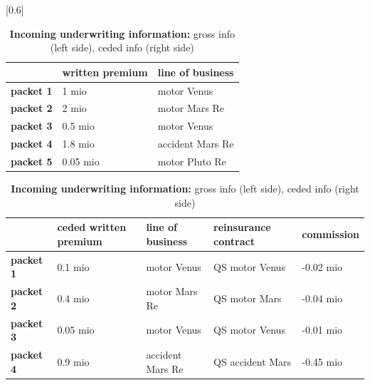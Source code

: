 {\begin{table}[htb!]
\centering
{}[0.6]{
\begin{tabular}{|l|l|l|}
\hline
\rule{0pt}{4ex} & \textbf{written premium} & \textbf{line of business} \\
\hline
\rule{0pt}{4ex} {\textbf{packet 1}} & 1 mio & {motor Venus} \\
\hline
\rule{0pt}{4ex} {\textbf{packet 2}} & 2 mio & {motor Mars Re}\\
\hline
\rule{0pt}{4ex} {\textbf{packet 3} }&0.5 mio & {motor Venus}\\
\hline
\rule{0pt}{4ex} {\textbf{packet 4}} &1.8 mio & {accident Mars Re} \\
\hline
\rule{0pt}{4ex} {\textbf{packet 5}} &0.05 mio &{motor Pluto Re} \\
\hline
\end{tabular}\hspace{0.6cm}
\begin{tabular}{|l|l|l|l|l|}
\hline
\rule{0pt}{4ex} & \textbf{ceded written premium} & \textbf{line of business} &\textbf{reinsurance contract}&\textbf{commission}\\
\hline
\rule{0pt}{4ex} {\textbf{packet 1}} & 0.1 mio & {motor Venus} & QS motor Venus & -0.02 mio \\
\hline
\rule{0pt}{4ex} {\textbf{packet 2}} & 0.4 mio & {motor Mars Re}& QS motor Mars& -0.04 mio\\
\hline
\rule{0pt}{4ex} {\textbf{packet 3} }&0.05 mio & {motor Venus}& QS motor Venus &-0.01 mio\\
\hline
\rule{0pt}{4ex} {\textbf{packet 4}} &0.9 mio & {accident Mars Re} & QS accident Mars&-0.45 mio\\
\hline
\end{tabular}}
\caption{\footnotesize{\textbf{Incoming underwriting information:} gross info (left side), ceded info (right side)}}
\label{table:underwritingInfo}
\end{table}

\begin{table}[htb!]


\end{table}}
